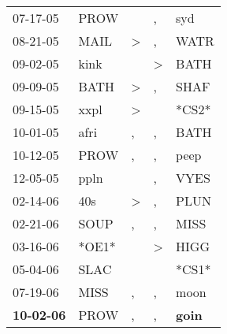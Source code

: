 \begin{supertabular}{p{0.07\textwidth}p{0.06\textwidth}p{0.02\textwidth}p{0.02\textwidth}p{0.06\textwidth}}
          07-17-05\textsuperscript{} &           PROW\textsuperscript{} &                  &                , &            syd\textsuperscript{} \\
          08-21-05\textsuperscript{} &           MAIL\textsuperscript{} &     \textgreater &                , &           WATR\textsuperscript{} \\
          09-02-05\textsuperscript{} &           kink\textsuperscript{} &                  &     \textgreater &           BATH\textsuperscript{} \\
          09-09-05\textsuperscript{} &           BATH\textsuperscript{} &     \textgreater &                , &           SHAF\textsuperscript{} \\
          09-15-05\textsuperscript{} &           xxpl\textsuperscript{} &     \textgreater &                  &                            *CS2* \\
          10-01-05\textsuperscript{} &           afri\textsuperscript{} &                , &                , &           BATH\textsuperscript{} \\
          10-12-05\textsuperscript{} &           PROW\textsuperscript{} &                , &                , &           peep\textsuperscript{} \\
          12-05-05\textsuperscript{} &           ppln\textsuperscript{} &                  &                , &           VYES\textsuperscript{} \\
          02-14-06\textsuperscript{} &            40s\textsuperscript{} &     \textgreater &                , &           PLUN\textsuperscript{} \\
          02-21-06\textsuperscript{} &           SOUP\textsuperscript{} &                , &                , &           MISS\textsuperscript{} \\
          03-16-06\textsuperscript{} &                            *OE1* &                  &     \textgreater &           HIGG\textsuperscript{} \\
          05-04-06\textsuperscript{} &           SLAC\textsuperscript{} &                  &                  &                            *CS1* \\
          07-19-06\textsuperscript{} &           MISS\textsuperscript{} &                , &                , &           moon\textsuperscript{} \\
 \textbf{10-02-06\textsuperscript{}} &           PROW\textsuperscript{} &                , &                , &  \textbf{goin\textsuperscript{}} \\

\end{supertabular}
